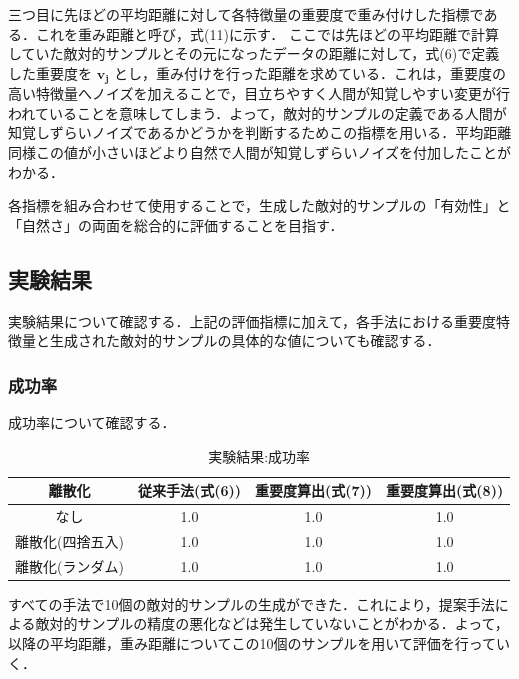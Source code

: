 三つ目に先ほどの平均距離に対して各特徴量の重要度で重み付けした指標である．これを重み距離と呼び，式(11)に示す．
ここでは先ほどの平均距離で計算していた敵対的サンプルとその元になったデータの距離に対して，式(6)で定義した重要度を $\bm{v_j}$ とし，重み付けを行った距離を求めている．これは，重要度の高い特徴量へノイズを加えることで，目立ちやすく人間が知覚しやすい変更が行われていることを意味してしまう．よって，敵対的サンプルの定義である人間が知覚しずらいノイズであるかどうかを判断するためこの指標を用いる．平均距離同様この値が小さいほどより自然で人間が知覚しずらいノイズを付加したことがわかる．

各指標を組み合わせて使用することで，生成した敵対的サンプルの「有効性」と「自然さ」の両面を総合的に評価することを目指す．

\subsection{実験結果}
実験結果について確認する．上記の評価指標に加えて，各手法における重要度特徴量と生成された敵対的サンプルの具体的な値についても確認する．

\subsubsection{成功率}
成功率について確認する．
\begin{table}[H]
    \centering
    \caption{実験結果:成功率}
    \begin{tabular}{|c|c|c|c|} \hline
        離散化 & 従来手法(式(6)) & 重要度算出(式(7)) & 重要度算出(式(8)) \\ \hline
        なし & 1.0 & 1.0 & 1.0 \\ \hline
        離散化(四捨五入) & 1.0 & 1.0 & 1.0 \\ \hline
        離散化(ランダム) & 1.0 & 1.0 & 1.0 \\ \hline
    \end{tabular}
\end{table}
すべての手法で10個の敵対的サンプルの生成ができた．これにより，提案手法による敵対的サンプルの精度の悪化などは発生していないことがわかる．よって，以降の平均距離，重み距離についてこの10個のサンプルを用いて評価を行っていく．

